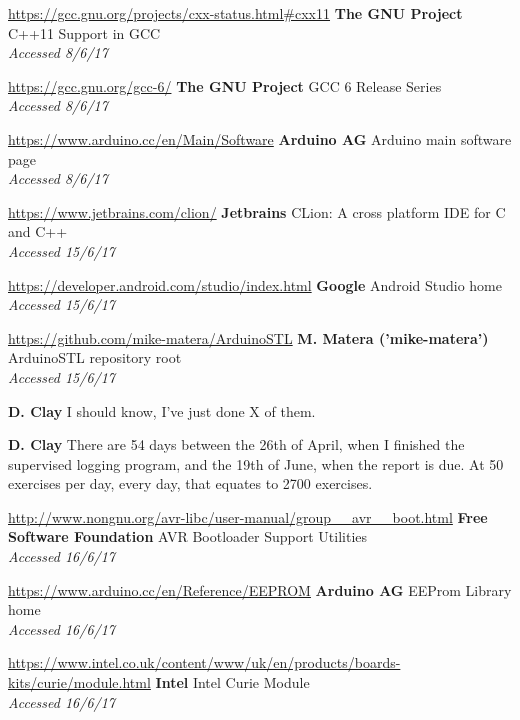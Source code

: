 \documentclass[a4paper]{article}
\begin{document}
\begin{thebibliography}{9}
\url{https://gcc.gnu.org/projects/cxx-status.html#cxx11}
\textbf{The GNU Project}
C++11 Support in GCC
\\\textit{Accessed 8/6/17}

\url{https://gcc.gnu.org/gcc-6/}
\textbf{The GNU Project}
GCC 6 Release Series
\\\textit{Accessed 8/6/17}

\url{https://www.arduino.cc/en/Main/Software}
\textbf{Arduino AG}
Arduino main software page
\\\textit{Accessed 8/6/17}

\url{https://www.jetbrains.com/clion/}
\textbf{Jetbrains}
CLion: A cross platform IDE for C and C++
\\\textit{Accessed 15/6/17}

\url{https://developer.android.com/studio/index.html}
\textbf{Google}
Android Studio home
\\\textit{Accessed 15/6/17}


\url{https://github.com/mike-matera/ArduinoSTL}
\textbf{M. Matera ('mike-matera')}
ArduinoSTL repository root
\\\textit{Accessed 15/6/17}

\textbf{D. Clay}
I should know, I've just done X of them. 

\textbf{D. Clay}
There are 54 days between the 26th of April, when I finished the supervised logging program, and the 19th of June, when the report is due. At 50 exercises per day, every day, that equates to 2700 exercises.


\url{http://www.nongnu.org/avr-libc/user-manual/group__avr__boot.html}
\textbf{Free Software Foundation}
AVR Bootloader Support Utilities
\\\textit{Accessed 16/6/17}

\url{https://www.arduino.cc/en/Reference/EEPROM}
\textbf{Arduino AG}
EEProm Library home
\\\textit{Accessed 16/6/17}

\url{https://www.intel.co.uk/content/www/uk/en/products/boards-kits/curie/module.html}
\textbf{Intel}
Intel Curie Module
\\\textit{Accessed 16/6/17}

\end{thebibliography}
\end{document}
